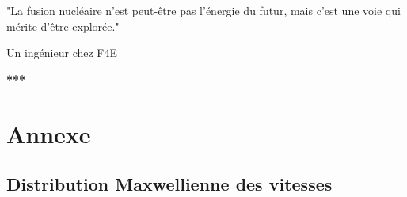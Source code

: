\documentclass{beamer}
\begin{document}
\begin{frame}
    "La fusion nucléaire n'est peut-être pas l'énergie du futur, mais c'est une voie qui mérite d'être explorée."
    \begin{flushright}
        Un ingénieur chez F4E
    \end{flushright}\bigskip\bigskip\bigskip

    \begin{center}
        \Large{\textbf{***}}
    \end{center}
\end{frame}

\section[]{Annexe}

\subsection{Distribution Maxwellienne des vitesses}
\end{document}
